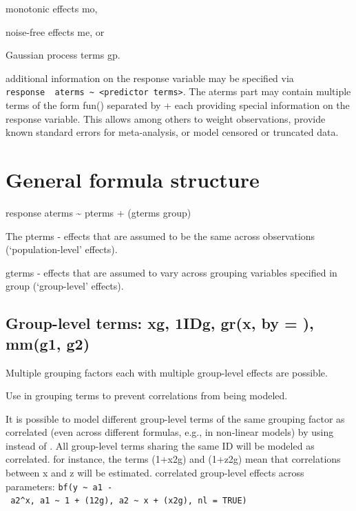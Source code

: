\documentclass[]{book}
\begin{document}
monotonic effects mo,

noise-free effects me, or

Gaussian process terms gp.

additional information on the response variable may be specified via
\texttt{response\ \textbar{}\ aterms\ \textasciitilde{}\ \textless{}predictor\ terms\textgreater{}}.
The aterms part may contain multiple terms of the form fun() separated
by + each providing special information on the response variable. This
allows among others to weight observations, provide known standard
errors for meta-analysis, or model censored or truncated data.

\section{General formula structure}\label{general-formula-structure}

response \textbar{} aterms \textasciitilde{} pterms + (gterms \textbar{}
group)

The pterms - effects that are assumed to be the same across observations
(`population-level' effects).

gterms - effects that are assumed to vary across grouping variables
specified in group (`group-level' effects).

\subsection{Group-level terms: x\textbar{}\textbar{}g,
1\textbar{}ID\textbar{}g, gr(x, by = ), mm(g1,
g2)}\label{group-level-terms-xg-1idg-grx-by-mmg1-g2}

Multiple grouping factors each with multiple group-level effects are
possible.

Use \textbar{}\textbar{} in grouping terms to prevent correlations from
being modeled.

It is possible to model different group-level terms of the same grouping
factor as correlated (even across different formulas, e.g., in
non-linear models) by using \textbar{}\textbar{} instead of \textbar{}.
All group-level terms sharing the same ID will be modeled as correlated.
for instance, the terms (1+x\textbar{}2\textbar{}g) and
(1+z\textbar{}2\textbar{}g) mean that correlations between x and z will
be estimated. correlated group-level effects across parameters:
\texttt{bf(y\ \textasciitilde{}\ a1\ -\ a2\^{}x,\ a1\ \textasciitilde{}\ 1\ +\ (1\textbar{}2\textbar{}g),\ a2\ \textasciitilde{}\ x\ +\ (x\textbar{}2\textbar{}g),\ nl\ =\ TRUE)}
\end{document}
